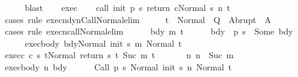 \begin{isabellebody}
\ \ \ \ \isamarkupfalse%
\ blast\isanewline
\ \ \isamarkupfalse%
\ exec\isanewline
\ \ \isamarkupfalse%
\ {\isachardoublequoteopen}{\isasymGamma}{\isasymturnstile}{\isasymlangle}call\ init\ {\isacharparenleft}p\ s{\isacharparenright}\ return\ c{\isacharcomma}Normal\ s{\isasymrangle}\ {\isacharequal}n{\isasymRightarrow}\ t{\isachardoublequoteclose}\isanewline
\ \ \ \ \isamarkupfalse%
\ {\isacharparenleft}cases\ rule{\isacharcolon}\ execn{\isacharunderscore}dynCall{\isacharunderscore}Normal{\isacharunderscore}elim{\isacharparenright}\isanewline
\ \ \isamarkupfalse%
\ \isamarkupfalse%
\ {\isachardoublequoteopen}t\ {\isasymin}\ Normal\ {\isacharbackquote}\ Q\ {\isasymunion}\ Abrupt\ {\isacharbackquote}\ A{\isachardoublequoteclose}\isanewline
\ \ \isamarkupfalse%
\ {\isacharparenleft}cases\ rule{\isacharcolon}\ execn{\isacharunderscore}call{\isacharunderscore}Normal{\isacharunderscore}elim{\isacharparenright}\isanewline
\ \ \ \ \isamarkupfalse%
\ bdy\ m\ t{\isacharprime}\isanewline
\ \ \ \ \isamarkupfalse%
\ bdy{\isacharcolon}\ {\isachardoublequoteopen}{\isasymGamma}\ {\isacharparenleft}p\ s{\isacharparenright}\ {\isacharequal}\ Some\ bdy{\isachardoublequoteclose}\isanewline
\ \ \ \ \isamarkupfalse%
\ exec{\isacharunderscore}body{\isacharcolon}\ {\isachardoublequoteopen}{\isasymGamma}{\isasymturnstile}{\isasymlangle}bdy{\isacharcomma}Normal\ {\isacharparenleft}init\ s{\isacharparenright}{\isasymrangle}\ {\isacharequal}m{\isasymRightarrow}\ Normal\ t{\isacharprime}{\isachardoublequoteclose}\ \isanewline
\ \ \ \ \isamarkupfalse%
\ exec{\isacharunderscore}c{\isacharcolon}\ {\isachardoublequoteopen}{\isasymGamma}{\isasymturnstile}{\isasymlangle}c\ s\ t{\isacharprime}{\isacharcomma}Normal\ {\isacharparenleft}return\ s\ t{\isacharprime}{\isacharparenright}{\isasymrangle}\ {\isacharequal}Suc\ m{\isasymRightarrow}\ t{\isachardoublequoteclose}\ \isanewline
\ \ \ \ \isamarkupfalse%
\ n{\isacharcolon}\ {\isachardoublequoteopen}n\ {\isacharequal}\ Suc\ m{\isachardoublequoteclose}\isanewline
\ \ \ \ \isamarkupfalse%
\ exec{\isacharunderscore}body\ n\ bdy\isanewline
\ \ \ \ \isamarkupfalse%
\ {\isachardoublequoteopen}{\isasymGamma}{\isasymturnstile}{\isasymlangle}Call\ {\isacharparenleft}p\ s{\isacharparenright}\ {\isacharcomma}Normal\ {\isacharparenleft}init\ s{\isacharparenright}{\isasymrangle}\ {\isacharequal}n{\isasymRightarrow}\ Normal\ t{\isacharprime}{\isachardoublequoteclose}\isanewline

\end{isabellebody}
